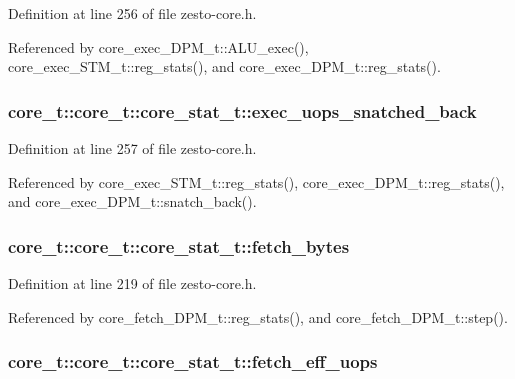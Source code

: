 Definition at line 256 of file zesto-core.h.

Referenced by core\_\-exec\_\-DPM\_\-t::ALU\_\-exec(), core\_\-exec\_\-STM\_\-t::reg\_\-stats(), and core\_\-exec\_\-DPM\_\-t::reg\_\-stats().
\subsubsection[{exec\_\-uops\_\-snatched\_\-back}]{ core\_\-t::core\_\-t::core\_\-stat\_\-t::exec\_\-uops\_\-snatched\_\-back}\label{structcore__t_1_1core__stat__t_4236da8517eb44a608d141215bdf23cc}




Definition at line 257 of file zesto-core.h.

Referenced by core\_\-exec\_\-STM\_\-t::reg\_\-stats(), core\_\-exec\_\-DPM\_\-t::reg\_\-stats(), and core\_\-exec\_\-DPM\_\-t::snatch\_\-back().
\subsubsection[{fetch\_\-bytes}]{ core\_\-t::core\_\-t::core\_\-stat\_\-t::fetch\_\-bytes}\label{structcore__t_1_1core__stat__t_8564eac1a391c1eb2bf15c3ad95e72ae}




Definition at line 219 of file zesto-core.h.

Referenced by core\_\-fetch\_\-DPM\_\-t::reg\_\-stats(), and core\_\-fetch\_\-DPM\_\-t::step().
\subsubsection[{fetch\_\-eff\_\-uops}]{ core\_\-t::core\_\-t::core\_\-stat\_\-t::fetch\_\-eff\_\-uops}\label{structcore__t_1_1core__stat__t_c2af89c2fe55760dfb25b837a3214630}




